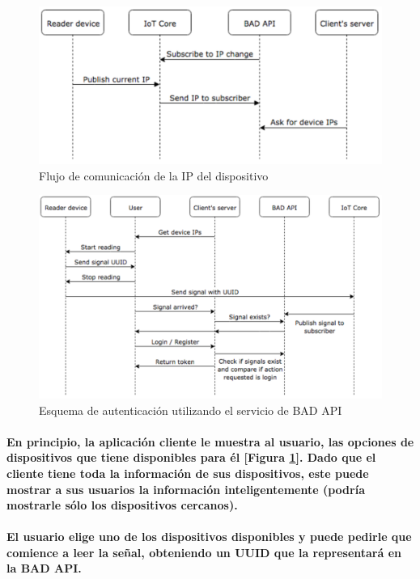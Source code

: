 \documentclass{article}
\begin{document}
\begin{figure}[ht]
    \centering
    \includegraphics[width=\textwidth]{ipexchange.png}%
    \caption{Flujo de comunicación de la IP del dispositivo}
    \label{fig:ipexchange}
\end{figure}

\begin{figure}[ht]
    \centering
    \includegraphics[width=\textwidth]{authschema.png}%
    \caption{Esquema de autenticación utilizando el servicio de BAD API}
    \label{fig:authschema}
\end{figure}

\paragraph{
En principio, la aplicación cliente le muestra al usuario, las opciones de dispositivos que tiene disponibles para él [Figura \ref{fig:ipexchange}]. Dado que el cliente tiene toda la información de sus dispositivos, este puede mostrar a sus usuarios la información inteligentemente (podría mostrarle sólo los dispositivos cercanos).
}
\paragraph{
El usuario elige uno de los dispositivos disponibles y puede pedirle que comience a leer la señal, obteniendo un UUID que la representará en la BAD API.
}
\end{document}
